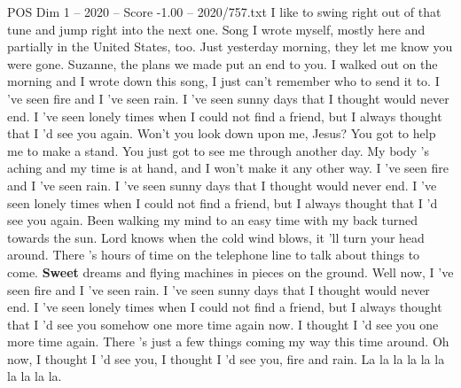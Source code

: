 \begin{textsample}{POS Dim 1 – 2020 – Score -1.00 – 2020/757.txt}  \label{ex:f1_pos_018}
I like to swing right out of that tune and jump right into the next one.
Song I wrote myself, mostly here and partially in the United States, too.
Just yesterday morning, they let me know you were gone.
Suzanne, the plans we made put an end to you.
I walked out on the morning and I wrote down this song, I just can't remember who to send it to.
I 've seen fire and I 've seen rain.
I 've seen sunny days that I thought would never end.
I 've seen lonely times when I could not find a friend, but I always thought that I 'd see you again.
Won't you look down upon me, Jesus?
You got to help me to make a stand.
You just got to see me through another day.
My body 's aching and my time is at hand, and I won't make it any other way.
I 've seen fire and I 've seen rain.
I 've seen sunny days that I thought would never end.
I 've seen lonely times when I could not find a friend, but I always thought that I 'd see you again.
Been walking my mind to an easy time with my back turned towards the sun.
Lord knows when the cold wind blows, it 'll turn your head around.
There 's hours of time on the telephone line to talk about things to come. \textbf{Sweet} dreams and flying machines in pieces on the ground.
Well now, I 've seen fire and I 've seen rain.
I 've seen sunny days that I thought would never end.
I 've seen lonely times when I could not find a friend, but I always thought that I 'd see you somehow one more time again now.
I thought I 'd see you one more time again.
There 's just a few things coming my way this time around.
Oh now, I thought I 'd see you, I thought I 'd see you, fire and rain.
La la la la la la la la la la.

\end{textsample}
